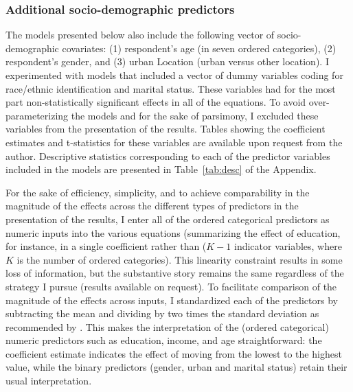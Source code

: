 \subsubsection{Additional socio-demographic predictors}
The models presented below also include the following vector of socio-demographic covariates:  (1) respondent's age (in seven ordered categories),  (2) respondent's gender, and (3) urban Location (urban versus other location).  I experimented with models that included a vector of dummy variables coding for race/ethnic identification and marital status.  These variables had for the most part non-statistically significant effects in all of the equations.  To avoid over-parameterizing the models and for the sake of parsimony, I excluded these variables from the presentation of the results. Tables showing the coefficient estimates and t-statistics for these variables are available upon request from the author.  Descriptive statistics corresponding to each of the predictor variables included in the models are presented in Table~\ref{tab:desc} of the Appendix.  

For the sake of efficiency, simplicity, and to achieve comparability in the magnitude of the effects across the different types of predictors in the presentation of the results, I enter all of the ordered categorical predictors as numeric inputs into the various equations (summarizing the effect of education, for instance, in a single coefficient rather than ($K-1$ indicator variables, where $K$ is the number of ordered categories).  This linearity constraint results in some loss of information, but the substantive story remains the same regardless of the strategy I pursue (results available on request).  To facilitate comparison of the magnitude of the effects across inputs, I standardized each of the predictors by subtracting the mean and dividing by two times the standard deviation as recommended by \citet{gelman08}.  This makes the interpretation of  the (ordered categorical) numeric predictors such as education, income, and age straightforward: the coefficient estimate indicates the effect of moving from the lowest to the highest value, while the binary predictors (gender, urban and marital status) retain their usual interpretation.


